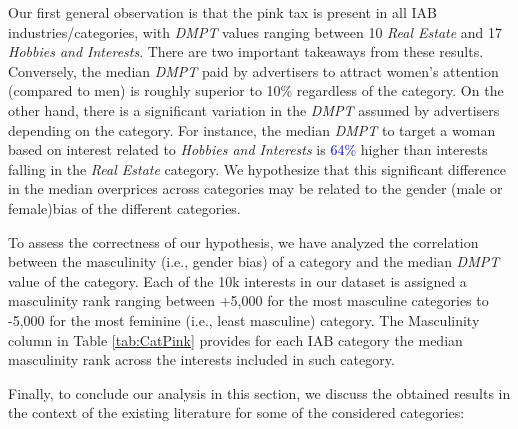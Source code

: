 \documentclass[twocolumn]{bmcart}\usepackage{lineno}
\begin{document}
\color{black}
Our first general observation is that the pink tax is present in all IAB industries/categories, with \emph{DMPT} values ranging between 10 \emph{Real Estate} and 17 \emph{Hobbies and Interests}. There are two important takeaways from these results. Conversely, the median \emph{DMPT} paid by advertisers to attract women's attention (compared to men) is roughly superior to 10\% regardless of the category. On the other hand, there is a significant variation in the \emph{DMPT} assumed by advertisers depending on the category. For instance, the median \emph{DMPT} to target a woman based on interest related to \emph{Hobbies and Interests} is \textcolor{blue}{64\%} higher than interests falling in the \emph{Real Estate} category. We hypothesize that this significant difference in the median overprices across categories may be related to the gender (male or female)bias of the different categories.

To assess the correctness of our hypothesis, we have analyzed the correlation between the masculinity (i.e., gender bias) of a category and the median \emph{DMPT} value of the category. Each of the 10k interests in our dataset is assigned a masculinity rank ranging between +5,000 for the most masculine categories to -5,000 for the most feminine (i.e., least masculine) category. The Masculinity column in Table \ref{tab:CatPink} provides for each IAB category the median masculinity rank across the interests included in such category.

\color{black}


Finally, to conclude our analysis in this section, we discuss the obtained results in the context of the existing literature for some of the considered categories:
\end{document}

